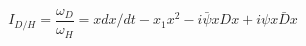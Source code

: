 \begin{equation}\label{IDH}
I_{D/H}=  \frac{\omega _{D}}{\omega _{H}}=xdx/dt-x_1x^2-i\bar{\psi}x Dx+i\psi x\bar{D}x
\end{equation}

